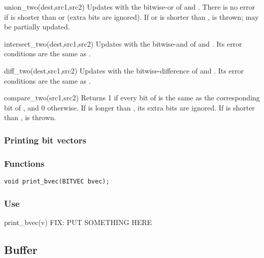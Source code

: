 \begin{defun}{union_two}{(dest,src1,src2)}
Updates  with the bitwise-or of  and .
There is no error if  is shorter than  or
 (extra bits are ignored).  If  or 
is shorter than ,  is thrown;
 may be partially updated.
\end{defun}

\begin{defun}{intersect_two}{(dest,src1,src2)}
Updates  with the bitwise-and of  and .
Its error conditions are the same as .
\end{defun}

\begin{defun}{diff_two}{(dest,src1,src2)}
Updates  with the bitwise-difference of  and
.  Its error conditions are the same as .
\end{defun}

\begin{defun}{compare_two}{(src1,src2)}
Returns 1 if every bit of
 is the same as the corresponding bit of , and 0
otherwise.  If  is longer than , its extra bits are
ignored.  If  is shorter than ,
 is thrown.
\end{defun}

\subsubsection*{Printing bit vectors}

\subsubsection*{Functions}
\begin{verbatim}
void print_bvec(BITVEC bvec);
\end{verbatim}

\subsubsection*{Use}

\begin{defun}{print_bvec}{(v)}
FIX: PUT SOMETHING HERE
\end{defun}

\subsection{Buffer}

